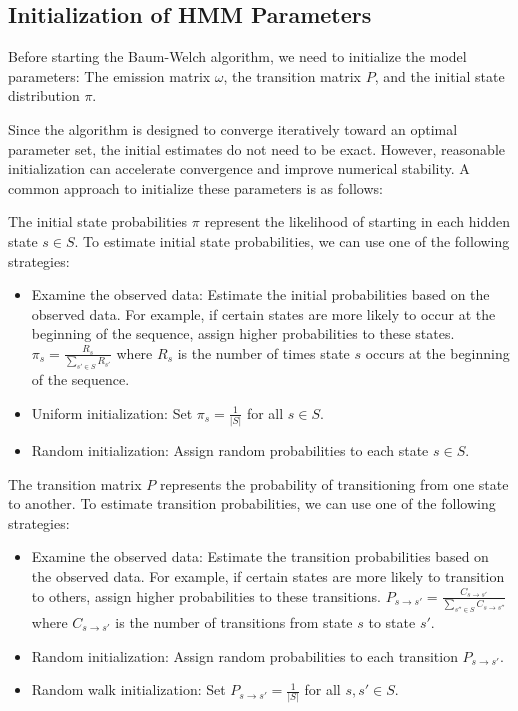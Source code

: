 \subsection{Initialization of HMM Parameters}\label{subsec:initialization}
Before starting the Baum-Welch algorithm, we need to initialize the model parameters: The emission matrix $\omega$, the transition matrix $P$, and the initial state distribution $\pi$.

Since the algorithm is designed to converge iteratively toward an optimal parameter set, the initial estimates do not need to be exact. However, reasonable initialization can accelerate convergence and improve numerical stability. A common approach to initialize these parameters is as follows:

The initial state probabilities $\pi$ represent the likelihood of starting in each hidden state $s \in S$. 
To estimate initial state probabilities, we can use one of the following strategies:
\begin{itemize}
    \item Examine the observed data: Estimate the initial probabilities based on the observed data. For example, if certain states are more likely to occur at the beginning of the sequence, assign higher probabilities to these states. 
    $\pi_s = \frac{R_s}{\sum_{s' \in S} R_{s'}}$ where $R_s$ is the number of times state $s$ occurs at the beginning of the sequence.
    \item Uniform initialization: Set $\pi_s = \frac{1}{|S|}$ for all $s \in S$.
    \item Random initialization: Assign random probabilities to each state $s \in S$.
\end{itemize}


The transition matrix $P$ represents the probability of transitioning from one state to another. 
To estimate transition probabilities, we can use one of the following strategies:
\begin{itemize}
    \item Examine the observed data: Estimate the transition probabilities based on the observed data. For example, if certain states are more likely to transition to others, assign higher probabilities to these transitions. 
    $P_{s \rightarrow s'} = \frac{C_{s \rightarrow s'}}{\sum_{s'' \in S} C_{s \rightarrow s''}}$ where $C_{s \rightarrow s'}$ is the number of transitions from state $s$ to state $s'$.
    \item Random initialization: Assign random probabilities to each transition $P_{s \rightarrow s'}$.
    \item Random walk initialization: Set $P_{s \rightarrow s'} = \frac{1}{|S|}$ for all $s, s' \in S$.
\end{itemize}


